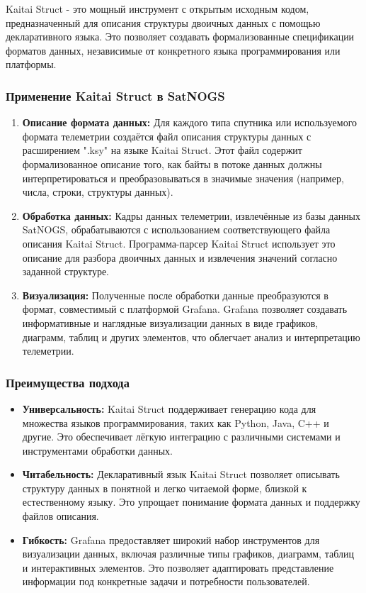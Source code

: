 \documentclass[12pt, a4paper]{extreport}
\begin{document}
Kaitai Struct - это мощный инструмент с открытым исходным кодом, предназначенный для описания структуры двоичных данных с помощью декларативного языка.  Это позволяет создавать формализованные спецификации форматов данных,  независимые от конкретного языка программирования или платформы.

\subsubsection{Применение Kaitai Struct в SatNOGS}

\begin{enumerate}
    \item \textbf{Описание формата данных:} Для каждого типа спутника или используемого формата телеметрии создаётся файл описания структуры данных с расширением ".ksy" на языке Kaitai Struct. Этот файл содержит формализованное описание того, как байты в потоке данных должны интерпретироваться и преобразовываться в значимые значения (например, числа, строки, структуры данных).
    \item \textbf{Обработка данных:} Кадры данных телеметрии, извлечённые из базы данных SatNOGS, обрабатываются с использованием соответствующего файла описания Kaitai Struct.  Программа-парсер Kaitai Struct использует это описание для разбора двоичных данных и извлечения значений согласно заданной структуре.
    \item \textbf{Визуализация:} Полученные после обработки данные преобразуются в формат, совместимый с платформой Grafana.  Grafana  позволяет создавать информативные и наглядные  визуализации данных в виде графиков, диаграмм, таблиц и других элементов,  что облегчает анализ и интерпретацию телеметрии.
\end{enumerate}

\subsubsection{Преимущества подхода}

\begin{itemize}[label={--}] %
    \item \textbf{Универсальность:} Kaitai Struct поддерживает генерацию кода для множества языков программирования, таких как Python, Java, C++ и другие. Это обеспечивает лёгкую интеграцию с различными системами и инструментами обработки данных.
    \item \textbf{Читабельность:}  Декларативный язык Kaitai Struct позволяет описывать структуру данных в понятной и легко читаемой форме,  близкой к естественному языку. Это упрощает понимание формата данных и поддержку файлов описания.
    \item \textbf{Гибкость:} Grafana предоставляет широкий набор инструментов для визуализации данных, включая различные типы графиков, диаграмм, таблиц и интерактивных элементов.  Это позволяет адаптировать представление информации под конкретные задачи и потребности пользователей.
\end{itemize}
\end{document}

